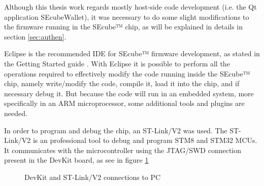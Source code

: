 Although this thesis work regards mostly host-side code development (i.e. the Qt application SEcubeWallet), it was necessary to do some slight modifications to the firmware running in the SEcube™ chip, as will be explained in details in section \ref{sec:authen}. 

Eclipse is the recommended IDE for SEcube™ firmware development, as stated in the Getting Started guide \cite{GetStart}. With Eclipse it is possible to perform all the operations required to effectively modify the code running inside the SEcube™ chip, namely write/modify the code, compile it, load it into the chip, and if necessary debug it. But because the code will run in an embedded system, more specifically in an ARM microprocessor, some additional tools and plugins are needed. 

In order to program and debug the chip, an ST-Link/V2 was used. The ST-Link/V2 is an professional tool to debug and program STM8 and STM32 MCUs. It communicates with the microcontroller using the JTAG/SWD connection present in the DevKit board, as see in figure \ref{fig:con}

\begin{figure}[ht]
  \centering
  {}
  \caption{DevKit and ST-Link/V2 connections to PC}
 \label{fig:con}
\end{figure}

